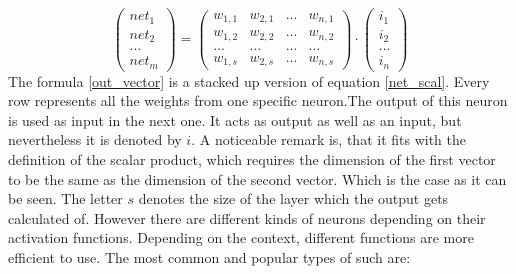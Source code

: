 \documentclass[12pt]{article}
\begin{document}
\begin{equation}
    \begin{pmatrix}net_{1}\\ net_{2}\\ ...\\ net_{m}\end{pmatrix} =\begin{pmatrix}
w_{1, 1} & w_{2, 1}  & ... &w_{n,1} \\ 
w_{1, 2} & w_{2, 2} & ... & w_{n,2} \\ 
... & ... &  ... & ...\\ 
w_{1,s} & w_{2, s} & ...  & w_{n, s}
\end{pmatrix} \cdot \begin{pmatrix}
i_{1}\\ 
i_{2}\\ 
...\\
i_{n}
\end{pmatrix}
\label{out_vector}
\end{equation}
The formula \ref{out_vector} is a stacked up version of equation \ref{net_scal}. Every row represents all the weights from one specific neuron.The output of this neuron is used as input in the next one. It acts as output as well as an input, but nevertheless it is denoted by $i$. A noticeable remark is, that it fits with the definition of the scalar product, which requires the dimension of the first vector to be the same as the dimension of the second vector. Which is the case as it can be seen. The letter $s$ denotes the size of the layer which the output gets calculated of.
However there are different kinds of neurons depending on their activation functions. Depending on the context, different functions are more efficient to use. The most common and popular types of such are:  \cite{neuronal_network}
\end{document}
